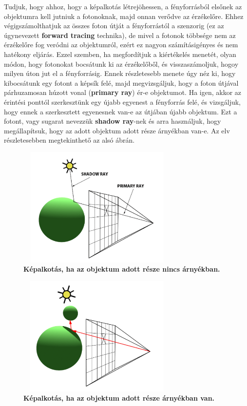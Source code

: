 \documentclass[12pt]{article}
\theoremstyle{plain}
\begin{document}
 Tudjuk, hogy ahhoz, hogy a képalkotás létrejöhessen, a fényforrásból elsőnek az objektumra kell jutniuk a fotonoknak, majd onnan verődve az érzékelőre. Ehhez végigszámolthatjuk az összes foton útját a fényforrástól a szenzorig (ez az úgynevezett \textbf{forward tracing} technika), de mivel a fotonok többsége nem az érzékelőre fog veródni az objektumról, ezért ez nagyon számításigényes és nem hatékony eljárás. Ezzel szemben, ha megfordítjuk a kiértékelés menetét, olyan módon, hogy fotonokat bocsátunk ki az érzékelőből, és visszaszámoljuk, hogoy milyen úton jut el a fényforrásig. Ennek részletesebb menete úgy néz ki, hogy kibocsátunk egy fotont a képsík felé, majd megvizsgáljuk, hogy a foton útjával párhuzamosan húzott vonal (\textbf{primary ray}) ér-e objektumot. Ha igen, akkor az érintési ponttól szerkesztünk egy újabb egyenest a fényforrás felé, és vizsgáljuk, hogy ennek a szerkesztett egyenesnek van-e az útjában újabb objektum. Ezt a fotont, vagy sugarat nevezzük \textbf{shadow ray}-nek és arra használjuk, hogy megállapítsuk, hogy az adott objektum adott része árnyékban van-e. Az elv részletesebben megtekinthető az alsó ábrán.
 
 \begin{figure}[H]
    \centering
    \includegraphics[width=8cm, height=6cm]{media/shadow1.PNG}
    \caption{\textbf{Képalkotás, ha az objektum adott része nincs árnyékban.}}
    \label{fig:GeneralDiagram}
 \end{figure}
 
 \begin{figure}[H]
    \centering
    \includegraphics[width=8cm, height=6cm]{media/shadow2.PNG}
    \caption{\textbf{Képalkotás, ha az objektum adott része árnyékban van.}}
    \label{fig:GeneralDiagram}
 \end{figure}
 
\end{document}
